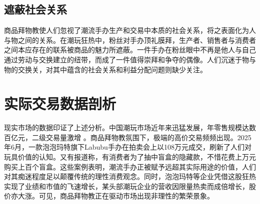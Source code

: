 \subsection*{遮蔽社会关系}
商品拜物教使人们忽视了潮流手办生产和交易中本质的社会关系，将之表面化为人与物之间的关系。在潮玩狂热中，粉丝对手办顶礼膜拜，生产者、销售者与消费者之间本应存在的联系被商品的魅力所遮蔽。一件手办在粉丝眼中不再是他人与自己通过劳动与交换建立的纽带，而成了一件值得崇拜和争夺的偶像\cite{MYSD202406008}。人们沉迷于物与物的交换关，对其中蕴含的社会关系和利益分配问题则缺少关注。
\section{实际交易数据剖析}
现实市场的数据印证了上述分析。中国潮玩市场近年来迅猛发展，年零售规模达数百亿元，二级交易量激增
\cite{ChaoWanChanYeFaZhanBaoGao2023XinHuaWang,SouhuNews2022TidePlayReport}
。商品拜物教氛围下，极端的高价交易频频出现。2025年6月，一款泡泡玛特旗下Labubu手办在拍卖会上以108万元成交，刷新了人们对玩具价值的认知\cite{Economic21Labubu2025}。又有报道称，有消费者为了抽中盲盒的隐藏款，不惜花费上万元购买上百个盲盒\cite{ModernExpress2022BlindBoxRegulation}。这些案例表明，潮流手办正被赋予远超其实际用途的价值，人们对其痴迷程度足以颠覆传统的理性消费观念。同时，泡泡玛特等企业凭借这股狂热实现了业绩和市值的飞速增长，某头部潮玩企业的营收因限量热卖而成倍增长，股价亦大涨\cite{Economic21Labubu2025}。可见，商品拜物教正在驱动市场出现非理性的繁荣景象。